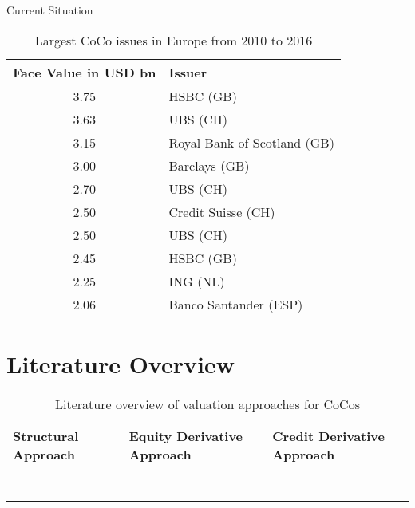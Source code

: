 Current Situation

\begin{table}[h]
	\centering
	\begin{tabular}{cl}
		\toprule
			Face Value in USD bn & Issuer \\
		\midrule
			3.75 & HSBC (GB) \\
			3.63 & UBS (CH) \\
			3.15 & Royal Bank of Scotland (GB) \\
			3.00 & Barclays (GB) \\
			2.70 & UBS (CH) \\
			2.50 & Credit Suisse (CH) \\
			2.50 & UBS (CH) \\
			2.45 & HSBC (GB) \\
			2.25 & ING (NL) \\
			2.06 & Banco Santander (ESP)\\
		\bottomrule
	\end{tabular}
	\caption[Largest CoCo issues in Europe]{Largest CoCo issues in Europe from 2010 to 2016 \citep{schmuddel2016}}
\end{table}

\section{Literature Overview}


\begin{table}[H]
	\setlength{\extrarowheight}{2.5pt}
	\centering
	\begin{tabular}{>{\centering\arraybackslash}p{4cm}>{\centering\arraybackslash}p{4cm}>{\centering\arraybackslash}p{4cm}}
		\toprule
			Structural Approach & Equity Derivative Approach & Credit Derivative Approach \\
		\midrule
			\citet{pennacchi2010structural} & \citet{de2011pricing} &  \citet{de2011pricing}\\
			\citet{glasserman2012contingent}  & \citet{henriques2011making} & \\
			\citet{madan2011conic}  &  &  \\
			\citet{albul2010contingent}  &  &  \\
			\citet{sundaresan2015design}  &  &  \\
			\citet{hilscher2014bank}  &  &  \\
			\citet{buergi2013pricing} &  &  \\
		\bottomrule
	\end{tabular}
	\caption[Literature overview of valuation approaches for CoCos] {Literature overview of valuation approaches for CoCos \citep{erismann2015pricing}}
\end{table}

